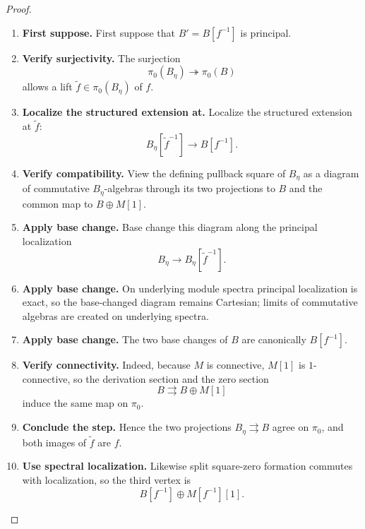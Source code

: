 \begin{proof}
\leavevmode
\begin{enumerate}[label=\textup{(\arabic*)}]
    \item \textbf{First suppose.}
    First suppose that \(B'=B[f^{-1}]\) is principal.

    \item \textbf{Verify surjectivity.}
    The surjection
    \[
        \pi_0(B_\eta)\twoheadrightarrow\pi_0(B)
    \]
    allows a lift \(\widetilde f\in\pi_0(B_\eta)\) of \(f\).

    \item \textbf{Localize the structured extension at.}
    Localize the structured extension at \(\widetilde f\):
    \[
        B_\eta[\widetilde f^{-1}]
        \longrightarrow
        B[f^{-1}].
    \]

    \item \textbf{Verify compatibility.}
    View the defining pullback square of \(B_\eta\) as a diagram of commutative
    \(B_\eta\)-algebras through its two projections to \(B\) and the common map to
    \(B\oplus M[1]\).

    \item \textbf{Apply base change.}
    Base change this diagram along the principal localization
    \[
        B_\eta\longrightarrow B_\eta[\widetilde f^{-1}].
    \]

    \item \textbf{Apply base change.}
    On underlying module spectra principal localization is exact, so the base-changed diagram
    remains Cartesian; limits of commutative algebras are created on underlying spectra.

    \item \textbf{Apply base change.}
    The two base changes of \(B\) are canonically \(B[f^{-1}]\).

    \item \textbf{Verify connectivity.}
    Indeed, because \(M\) is connective, \(M[1]\) is \(1\)-connective, so the
    derivation section and the zero section
    \[
        B\rightrightarrows B\oplus M[1]
    \]
    induce the same map on \(\pi_0\).

    \item \textbf{Conclude the step.}
    Hence the two projections \(B_\eta\rightrightarrows B\) agree on \(\pi_0\), and both images of \(\widetilde f\)
    are \(f\).

    \item \textbf{Use spectral localization.}
    Likewise split square-zero formation commutes with localization, so the third vertex is
    \[
        B[f^{-1}]\oplus M[f^{-1}][1].
    \]


\end{enumerate}
\end{proof}
